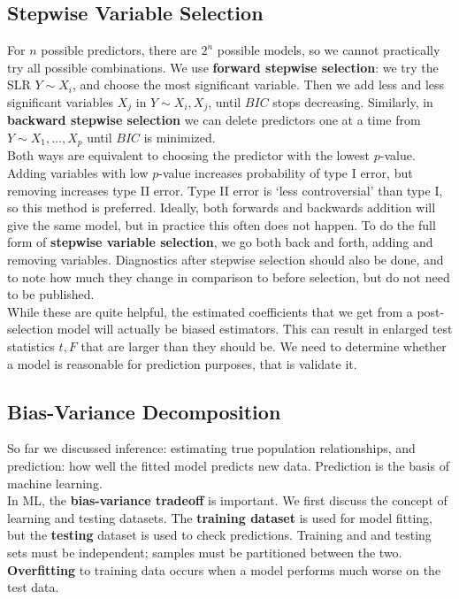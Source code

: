 \documentclass[12pt, a4paper]{article}
\theoremstyle{definition}
\begin{document}
	\subsection{Stepwise Variable Selection}
	
	 For $n$ possible predictors, there are $2^n$ possible models, so we cannot practically try all possible combinations. We use {\bf forward stepwise selection}: we try the SLR $Y \sim X_i$, and choose the most significant variable. Then we add less and less significant variables $X_j$ in $Y \sim X_i, X_j$, until $BIC$ stops decreasing. Similarly, in {\bf backward stepwise selection} we can delete predictors one at a time from $Y \sim X_1, \ldots, X_p$ until $BIC$ is minimized. \\
	 
	 Both ways are equivalent to choosing the predictor with the lowest $p$-value. Adding variables with low $p$-value increases probability of type I error, but removing increases type II error. Type II error is `less controversial' than type I, so this method is preferred. Ideally, both forwards and backwards addition will give the same model, but in practice this often does not happen. To do the full form of {\bf stepwise variable selection}, we go both back and forth, adding and removing variables. Diagnostics after stepwise selection should also be done, and to note how much they change in comparison to before selection, but do not need to be published.\\
	 
	 While these are quite helpful, the estimated coefficients that we get from a post-selection model will actually be biased estimators. This can result in enlarged test statistics $t, F$ that are larger than they should be. We need to determine whether a model is reasonable for prediction purposes, that is validate it.
	 
	 \subsection{Bias-Variance Decomposition}
	 
	 So far we discussed inference: estimating true population relationships, and prediction: how well the fitted model predicts new data. Prediction is the basis of machine learning.\\
	 
	 In ML, the {\bf bias-variance tradeoff} is important. We first discuss the concept of learning and testing datasets. The {\bf training dataset} is used for model fitting, but the {\bf testing} dataset is used to check predictions. Training and and testing sets must be independent; samples must be partitioned between the two. {\bf Overfitting} to training data occurs when a model performs much worse on the test data. 
	 
\end{document}
